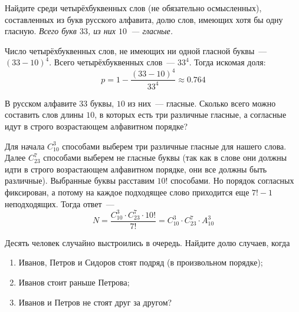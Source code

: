 \begin{Exercise}[counter=SecExercise, label={exercise:combinatorics:at_least_one_vowel}]
    \noindent
    Найдите среди четырёхбуквенных слов (не обязательно осмысленных), составленных из букв русского алфавита,
    долю слов, имеющих хотя бы одну гласную.
    \newline
    \textit{Всего букв $ 33 $, из них $ 10 $~--- гласные.}
\end{Exercise}

\begin{Answer}
    \noindent
    Число четырёхбуквенных слов, не имеющих ни одной гласной буквы~--- $ (33 - 10)^4 $.
    Всего четырёхбуквенных слов~--- $ 33^4 $.
    Тогда искомая доля:
    \[
        p = 1 - \frac{(33 - 10)^4}{33^4} \approx 0.764
    \]
\end{Answer}


\begin{Exercise}[counter=SecExercise]
    \noindent
    В русском алфавите $ 33 $ буквы, $ 10 $ из них~--- гласные.
    Сколько всего можно составить слов длины $ 10 $, в которых есть три различные гласные, а согласные идут в строго возрастающем алфавитном порядке?
\end{Exercise}

\begin{Answer}
    \noindent
    Для начала $ C_{10}^3 $ способами выберем три различные гласные для нашего слова.
    Далее $ C_{23}^7 $ способами выберем не гласные буквы
    (так как в слове они должны идти в строго возрастающем алфавитном порядке, они все должны быть различные).
    Выбранные буквы расставим $ 10! $ способами.
    Но порядок согласных фиксирован, а потому на каждое подходящее слово приходится еще $ 7! - 1 $ неподходящих.
    Тогда ответ~---
    \[
        N = \frac{C_{10}^3 \cdot C_{23}^7 \cdot 10!}{7!} = C_{10}^3 \cdot C_{23}^7 \cdot A_{10}^3
    \]
\end{Answer}


\begin{Exercise}[counter=SecExercise, label={exercise:combinatorics:queue}]
    \noindent
    Десять человек случайно выстроились в очередь.
    Найдите долю случаев, когда
    \begin{enumerate}[label=\textbf{\alph*)}]
        \item Иванов, Петров и Сидоров стоят подряд (в произвольном порядке);
        \item Иванов стоит раньше Петрова;
        \item Иванов и Петров не стоят друг за другом?
    \end{enumerate}
\end{Exercise}

